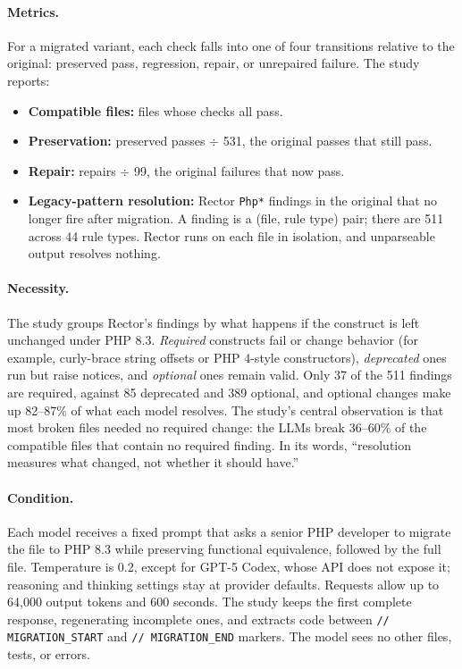 \documentclass[11pt]{article}
\newcommand{\code}[1]{\texttt{#1}}
\begin{document}
\paragraph{Metrics.}
For a migrated variant, each check falls into one of four transitions relative to the original: preserved pass, regression, repair, or unrepaired failure.
The study reports:
\begin{itemize}
  \item \textbf{Compatible files:} files whose checks all pass.
  \item \textbf{Preservation:} preserved passes $\div$ 531, the original passes that still pass.
  \item \textbf{Repair:} repairs $\div$ 99, the original failures that now pass.
  \item \textbf{Legacy-pattern resolution:} Rector \code{Php*} findings in the original that no longer fire after migration. A finding is a (file, rule type) pair; there are 511 across 44 rule types. Rector runs on each file in isolation, and unparseable output resolves nothing.
\end{itemize}

\paragraph{Necessity.}
The study groups Rector's findings by what happens if the construct is left unchanged under PHP 8.3.
\emph{Required} constructs fail or change behavior (for example, curly-brace string offsets or PHP 4-style constructors), \emph{deprecated} ones run but raise notices, and \emph{optional} ones remain valid.
Only 37 of the 511 findings are required, against 85 deprecated and 389 optional, and optional changes make up 82--87\% of what each model resolves.
The study's central observation is that most broken files needed no required change: the LLMs break 36--60\% of the compatible files that contain no required finding.
In its words, ``resolution measures what changed, not whether it should have.''

\paragraph{Condition.}
Each model receives a fixed prompt that asks a senior PHP developer to migrate the file to PHP 8.3 while preserving functional equivalence, followed by the full file.
Temperature is 0.2, except for GPT-5 Codex, whose API does not expose it; reasoning and thinking settings stay at provider defaults.
Requests allow up to 64,000 output tokens and 600 seconds.
The study keeps the first complete response, regenerating incomplete ones, and extracts code between \code{// MIGRATION\_START} and \code{// MIGRATION\_END} markers.
The model sees no other files, tests, or errors.
\end{document}

